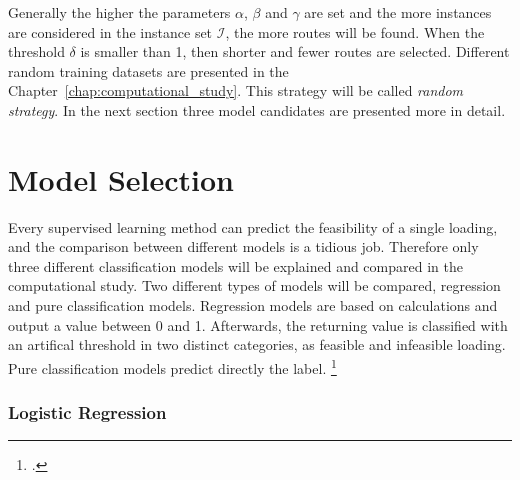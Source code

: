 Generally the higher the parameters $\alpha$, $\beta$ and $\gamma$ are set and the more instances
are considered in the instance set $\mathcal{I}$, the more routes will be found. When the threshold $\delta$
is smaller than 1, then shorter and fewer routes are selected. Different
random training datasets are presented in the Chapter~\ref{chap:computational_study}.
This strategy will be called \textit{random strategy}. In the next section three model candidates
are presented more in detail.

\section{Model Selection}
\label{sec:modelselection}
Every supervised learning method can predict the feasibility of a single loading, and the comparison
between different models is a tidious job. Therefore only three different classification
models will be explained and compared in the computational study.
Two different types of models will be compared, regression and pure classification models. Regression
models are based on calculations and output a value between 0 and 1. Afterwards, the returning value is classified with
an artifical threshold in two distinct categories, as feasible and infeasible loading. Pure classification
models predict directly the label. \footcite[cf.][p.5]{nasteski_overview_2017}

\subsubsection{Logistic Regression}

